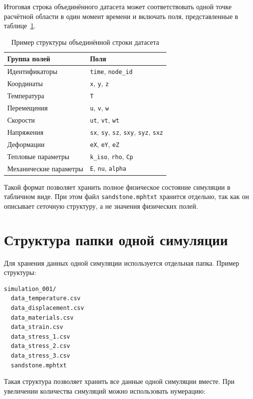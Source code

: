 Итоговая строка объединённого датасета может соответствовать одной точке расчётной области в один момент времени и включать поля, представленные в таблице~\ref{tab:combined_dataset}.

\begin{table}[h!]
\centering
\caption{Пример структуры объединённой строки датасета}
\label{tab:combined_dataset}
\begin{tabular}{|p{4cm}|p{9cm}|}
\hline
\textbf{Группа полей} & \textbf{Поля} \\
\hline
Идентификаторы & \texttt{time}, \texttt{node\_id} \\
\hline
Координаты & \texttt{x}, \texttt{y}, \texttt{z} \\
\hline
Температура & \texttt{T} \\
\hline
Перемещения & \texttt{u}, \texttt{v}, \texttt{w} \\
\hline
Скорости & \texttt{ut}, \texttt{vt}, \texttt{wt} \\
\hline
Напряжения & \texttt{sx}, \texttt{sy}, \texttt{sz}, \texttt{sxy}, \texttt{syz}, \texttt{sxz} \\
\hline
Деформации & \texttt{eX}, \texttt{eY}, \texttt{eZ} \\
\hline
Тепловые параметры & \texttt{k\_iso}, \texttt{rho}, \texttt{Cp} \\
\hline
Механические параметры & \texttt{E}, \texttt{nu}, \texttt{alpha} \\
\hline
\end{tabular}
\end{table}

Такой формат позволяет хранить полное физическое состояние симуляции в табличном виде. При этом файл \texttt{sandstone.mphtxt} хранится отдельно, так как он описывает сеточную структуру, а не значения физических полей.

\section{Структура папки одной симуляции}

Для хранения данных одной симуляции используется отдельная папка. Пример структуры:

\begin{verbatim}
simulation_001/
  data_temperature.csv
  data_displacement.csv
  data_materials.csv
  data_strain.csv
  data_stress_1.csv
  data_stress_2.csv
  data_stress_3.csv
  sandstone.mphtxt
\end{verbatim}

Такая структура позволяет хранить все данные одной симуляции вместе. При увеличении количества симуляций можно использовать нумерацию:

